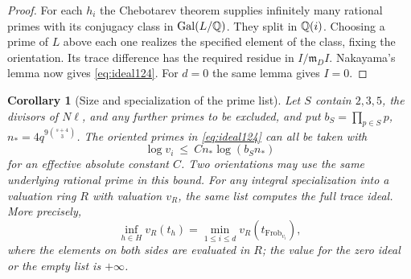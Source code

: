 \documentclass[a4paper,11pt]{article}
\newtheorem{corollary}[proposition]{Corollary}
\theoremstyle{definition}
\theoremstyle{remark}
\newcommand{\Frob}{\operatorname{Frob}}\newcommand{\Gal}{\operatorname{Gal}}
\numberwithin{equation}{section}
\begin{document}
\begin{proof}
For each \(h_i\) the Chebotarev theorem supplies infinitely
many rational primes with its conjugacy class in \(\Gal(L/\QQ)\).
They split in \(\mathbb Q(i)\). Choosing a prime of \(L\) above
each one realizes the specified element of the class, fixing
the orientation. Its trace difference has the required residue
in \(I/\mathfrak m_DI\). Nakayama's lemma now gives \eqref{eq:ideal124}.
For \(d=0\) the same lemma gives \(I=0\).
\end{proof}

\begin{corollary}[Size and specialization of the prime list]
\label{cor:size124}
Let \(S\) contain \(2,3,5\), the divisors of \(N\ell\), and
any further primes to be excluded, and put \(b_S=\prod_{p\in S}p\),
\(n_*=4q^{9\binom{s+4}{3}}\). The oriented primes in \eqref{eq:ideal124}
can all be taken with
\begin{equation}
                \log v_i\ \le\ C n_*\log(b_S n_*)
                                                        \label{eq:least124}
\end{equation}
for an effective absolute constant \(C\). Two orientations may
use the same underlying rational prime in this bound.
For any integral specialization into a valuation ring \(R\)
with valuation \(v_R\), the same list computes the full trace
ideal. More precisely,
\[
   \inf_{h\in H}v_R(t_h)=\min_{1\le i\le d}v_R(t_{\Frob_{v_i}}),
\]
where the elements on both sides are evaluated in \(R\);
the value for the zero ideal or the empty list is \(+\infty\).
\end{corollary}
\end{document}

